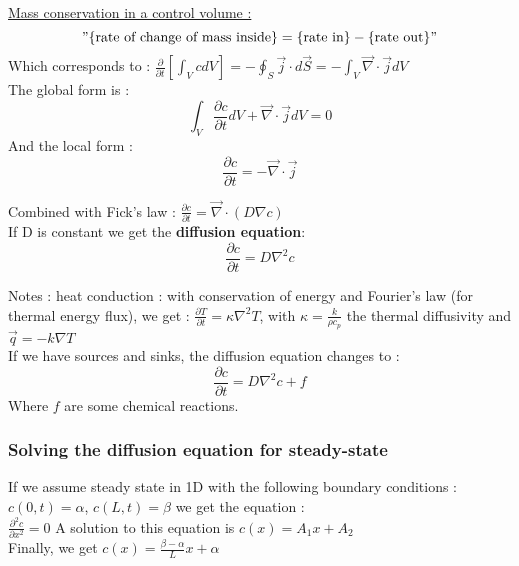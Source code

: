 \documentclass[../main.tex]{subfiles}
\begin{document}
\quad \underline{Mass conservation in a control volume :}\\
\begin{equation}
    "\{\text{rate of change of mass inside}\} = \{\text{rate in}\} - \{\text{rate out}\}"
\end{equation}
Which corresponds to : $\frac{\partial }{\partial t}[\int_V cdV] = -\oint_S \Vec{j}\cdot d\Vec{S} = -\int_V \Vec{\nabla} \cdot \Vec{j} dV$\\
The global form is :\\
\begin{equation}
    \int_V \frac{\partial c}{\partial t} dV + \Vec{\nabla} \cdot \Vec{j}dV = 0
\end{equation}
And the local form : \\
\begin{equation}
    \frac{\partial c}{\partial t} = -\Vec{\nabla} \cdot \Vec{j}
\end{equation}

Combined with Fick's law : $\frac{\partial c}{\partial t} = \Vec{\nabla} \cdot (D \nabla c)$\\
If D is constant we get the \textbf{diffusion equation}: \\
\begin{equation}
    \frac{\partial c}{\partial t} = D \nabla^2 c
\end{equation}

\color{gray}Notes : heat conduction : with conservation of energy and Fourier's law (for thermal energy flux), we get : $\frac{\partial T}{\partial t} = \kappa \nabla^2 T$, with $\kappa = \frac{k}{\rho c_p}$ the thermal diffusivity and $\Vec{q} = -k \nabla T$\color{black}\\

If we have sources and sinks, the diffusion equation changes to :\\
\begin{equation}
    \frac{\partial c}{\partial t} = D \nabla^2 c + f
\end{equation}
Where $f$ are some chemical reactions.\\


\subsubsection{Solving the diffusion equation for steady-state}
If we assume steady state in 1D with the following boundary conditions : $c(0,t) = \alpha$, $c(L,t) = \beta$ we get the equation : \\
$\frac{\partial^2 c}{\partial x^2} = 0$ A solution to this equation is $c(x) = A_1 x + A_2$\\
Finally, we get $c(x) = \frac{\beta-\alpha}{L}x+\alpha$\\
\end{document}
